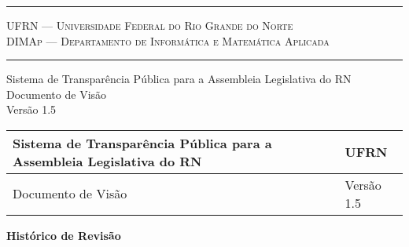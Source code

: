 \documentclass[12pt, a4paper]{article}
\begin{document}
    \begin{titlepage}
        \flushright
        \rule{\textwidth}{1pt}
        {\large \textsc{UFRN --- Universidade Federal do Rio Grande do Norte
                \\[0.5ex]
         \normalsize DIMAp --- Departamento de Informática e Matemática Aplicada}
        \vspace{-1ex}}
        \rule{\textwidth}{1pt}

        \vfill

        {\Huge Sistema de Transparência Pública para a Assembleia Legislativa
        do RN \\[1ex] \LARGE Documento de Visão \\[2ex] \large Versão 1.5}

        \vfill

    \end{titlepage}

    \begin{tabu}{X | X[-1]}
        \hline
        Sistema de Transparência Pública para a Assembleia Legislativa do RN &
        UFRN
        \\ \hline

        Documento de Visão &
        Versão 1.5
        \\ \hline
    \end{tabu}

    \bigskip

    {\Large\textbf{Histórico de Revisão}}

    \vspace{2ex}
\end{document}
